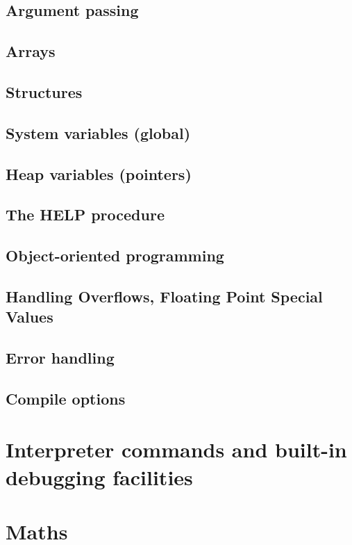 \documentclass[10pt,titleauthor,openany]{mwbk}
\begin{document}
  \section{Argument passing}
  
  \section{Arrays}
  
  \section{Structures}
  
  \section{System variables (global)}
  
  \section{Heap variables (pointers)}
  
  \section{The HELP procedure}
  
  \section{Object-oriented programming}
  
  \section{Handling Overflows, Floating Point Special Values}
  
  \section{Error handling}
  
  \section{Compile options}
  
  \chapter{Interpreter commands and built-in debugging facilities}
  

  \chapter{Maths}
\end{document}
